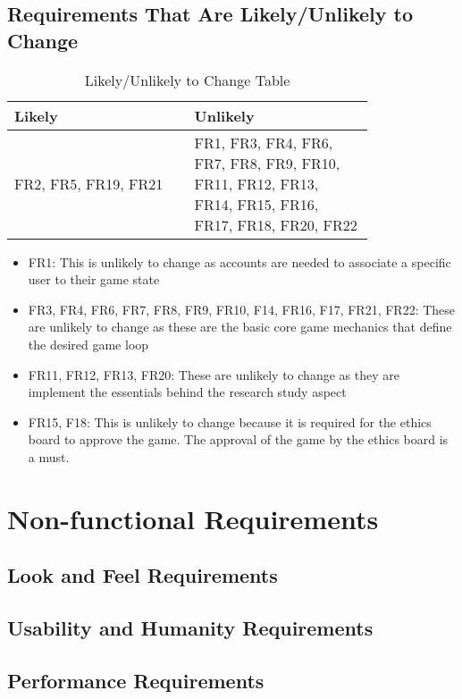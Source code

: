 \documentclass{article}
\begin{document}
\subsection{Requirements That Are Likely/Unlikely to Change}
\begin{table}[H]
  \centering
  \begin{tabular}{|p{0.40\linewidth} | p{0.40\linewidth}|}
  \hline
       Likely & Unlikely \\
       \hline
       FR2, FR5, FR19, FR21 & FR1, FR3, FR4, FR6, FR7, FR8, FR9, FR10, FR11, FR12, FR13, FR14, FR15, FR16, FR17, FR18, FR20, FR22    \\
       \hline
  \end{tabular}
  \caption{Likely/Unlikely to Change Table}
  \label{tab:my_label}
\end{table}
\begin{itemize}
  \item FR1: This is unlikely to change as accounts are needed to associate a specific user to their game state
  \item FR3, FR4, FR6, FR7, FR8, FR9, FR10, F14, FR16, F17, FR21, FR22: These are unlikely to change as these are the basic core game mechanics that define the desired game loop
  \item FR11, FR12, FR13, FR20: These are unlikely to change as they are implement the essentials behind the research study aspect
  \item FR15, F18: This is unlikely to change because it is required for the ethics board to approve the game. The approval of the game by the ethics board is a must.
  
\end{itemize}
\section{Non-functional Requirements}

\subsection{Look and Feel Requirements}

\subsection{Usability and Humanity Requirements}

\subsection{Performance Requirements}
\end{document}
